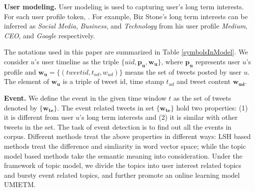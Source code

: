 \documentclass{sig-alternate-05-2015}
\begin{document}
\textbf{User modeling.} 
User modeling is used to capturing user's long term interests. 
For each user profile token, .
For example, Biz Stone's long term interests can be inferred as \textit{Social Media}, \textit{Business}, and \textit{Technology} from his user profile \textit{Medium}, \textit{CEO}, and \textit{Google} respectively.

The notations used in this paper are summarized in Table \ref{symbolsInModel}.
We consider \(u\)'s user timeline as  the triple \(\{uid, \bm{p_u},\bm{w_u}\} \), where \(\bm{p_u}\) represents user \(u\)'s profile and \(\bm{w_u}=\{(tweetid, t_{ud},w_{ud})\}\) means the set of tweets posted by user \(u\).
The element of \(\bm{w_u}\) is a triple of tweet id, time stamp \(t_{ud}\) and tweet content \(\bm{w_{ud}}\).



\textbf{Event.} We define the event in the given time window \(t\) as the set of tweets denoted by \( \{ \bm{w_{te}}\}\).
The event related tweets in set \( \{ \bm{w_{te}}\}\)  hold two properties: (1) it is different from user \(u\)'s long term interests and (2) it is similar with other tweets in the set.
The task of event detection is to find out all the events in corpus.
Different methods treat the above properties in different ways: LSH based methods\cite{petrovic2010streaming} treat the difference and simliarity in word vector space; while the topic model based methods\cite{timeUserLDA2012finding} take the semantic meaning into consideration.
Under the framework of topic model, we divide the topics into user interest related topics and bursty event related topics, and further promote an online learning model UMIETM.
\end{document}
